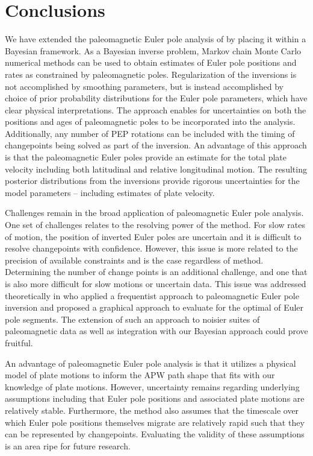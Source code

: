 \documentclass[11pt,letterpaper]{article}
\begin{document}
\section*{Conclusions}
\label{sec:conclusions}

We have extended the paleomagnetic Euler pole analysis of \cite{Gordon1984a} by placing it within a Bayesian framework. As a Bayesian inverse problem, Markov chain Monte Carlo numerical methods can be used to obtain estimates of Euler pole positions and rates as constrained by paleomagnetic poles. Regularization of the inversions is not accomplished by smoothing parameters, but is instead accomplished by choice of prior probability distributions for the Euler pole parameters, which have clear physical interpretations. The approach enables for uncertainties on both the positions and ages of paleomagnetic poles to be incorporated into the analysis. Additionally, any number of PEP rotations can be included with the timing of changepoints being solved as part of the inversion. An advantage of this approach is that the paleomagnetic Euler poles provide an estimate for the total plate velocity including both latitudinal and relative longitudinal motion. The resulting posterior distributions from the inversions provide rigorous uncertainties for the model parameters -- including estimates of plate velocity. 

Challenges remain in the broad application of paleomagnetic Euler pole analysis. One set of challenges relates to the resolving power of the method. For slow rates of motion, the position of inverted Euler poles are uncertain and it is difficult to resolve changepoints with confidence. However, this issue is more related to the precision of available constraints and is the case regardless of method. Determining the number of change points is an additional challenge, and one that is also more difficult for slow motions or uncertain data. This issue was addressed theoretically in \cite{Gallo2021a} who applied a frequentist approach to paleomagnetic Euler pole inversion and proposed a graphical approach to evaluate for the optimal of Euler pole segments. The extension of such an approach to noisier suites of paleomagnetic data as well as integration with our Bayesian approach could prove fruitful. 

An advantage of paleomagnetic Euler pole analysis is that it utilizes a physical model of plate motions to inform the APW path shape that fits with our knowledge of plate motions. However, uncertainty remains regarding underlying assumptions including that Euler pole positions and associated plate motions are relatively stable. Furthermore, the method also assumes that the timescale over which Euler pole positions themselves migrate are relatively rapid such that they can be represented by changepoints. Evaluating the validity of these assumptions is an area ripe for future research.    
\end{document}
